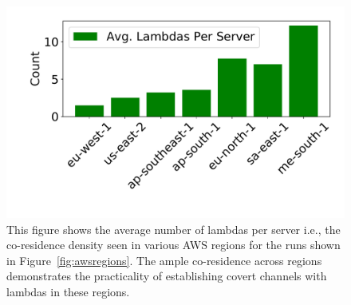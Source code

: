 
\begin{figure}[!t]
  \includegraphics[width=.99\linewidth]{fig/density.pdf}
  \caption{This figure shows the average number of lambdas per server i.e., the co-residence 
  density seen in various AWS regions for the runs shown in Figure~\ref{fig:awsregions}. 
  The ample co-residence across regions demonstrates the practicality of establishing 
  covert channels with lambdas in these regions.
\label{fig:density}}
\end{figure}

